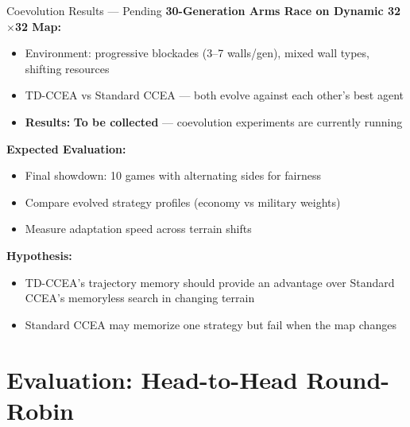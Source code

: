 \documentclass[aspectratio=169, 10pt]{beamer}
\begin{document}
\begin{frame}{Coevolution Results --- \textcolor{progAmber}{Pending}}
\small
\textbf{30-Generation Arms Race on Dynamic 32$\times$32 Map:}
\begin{itemize}
    \item Environment: progressive blockades (3--7 walls/gen), mixed wall types, shifting resources
    \item TD-CCEA vs Standard CCEA --- both evolve against each other's best agent
    \item \textbf{Results:} \textcolor{progAmber}{\textbf{To be collected}} --- coevolution experiments are currently running
\end{itemize}
\vspace{0.2cm}
\textbf{Expected Evaluation:}
\begin{itemize}
    \item Final showdown: 10 games with alternating sides for fairness
    \item Compare evolved strategy profiles (economy vs military weights)
    \item Measure adaptation speed across terrain shifts
\end{itemize}
\vspace{0.2cm}
\textbf{Hypothesis:}
\begin{itemize}
    \item TD-CCEA's trajectory memory should provide an advantage over Standard CCEA's memoryless search in changing terrain
    \item Standard CCEA may memorize one strategy but fail when the map changes
\end{itemize}
\end{frame}

\section{Evaluation: Head-to-Head Round-Robin}
\end{document}
